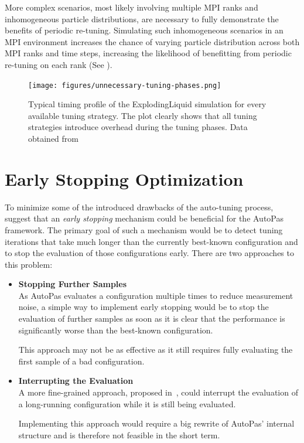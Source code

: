 \documentclass[conference]{IEEEtran}
\begin{document}
More complex scenarios, most likely involving multiple MPI ranks and inhomogeneous particle distributions, are necessary to fully demonstrate the benefits of periodic re-tuning. Simulating such inhomogeneous scenarios in an MPI environment increases the chance of varying particle distribution across both MPI ranks and time steps, increasing the likelihood of benefitting from periodic re-tuning on each rank (See \cite{Newcome2023Poster}).

\begin{figure}[h]
    \centering
    \texttt{[image: figures/unnecessary-tuning-phases.png]}
    \caption{
        Typical timing profile of the ExplodingLiquid simulation for every available tuning strategy. The plot clearly shows that all tuning strategies introduce overhead during the tuning phases. Data obtained from \cite{lerchner2024}
    }
    \label{fig:unnecessary-tuning-phases}
\end{figure}

\newpage

\section{Early Stopping Optimization}
\label{sec:early-stopping}

To minimize some of the introduced drawbacks of the auto-tuning process, \cite{endreport.pdf}\cite{Manuel_Lerchner_Thesis.pdf}\cite{autopas_issue673} suggest that an \textit{early stopping} mechanism could be beneficial for the AutoPas framework. The primary goal of such a mechanism would be to detect tuning iterations that take much longer than the currently best-known configuration and to stop the evaluation of those configurations early. There are two approaches to this problem:


\begin{itemize}
    \item \textbf{Stopping Further Samples}\\
          As AutoPas evaluates a configuration multiple times to reduce measurement noise, a simple way to implement early stopping would be to stop the evaluation of further samples as soon as it is clear that the performance is significantly worse than the best-known configuration.

          This approach may not be as effective as it still requires fully evaluating the first sample of a bad configuration.
    \item \textbf{Interrupting the Evaluation}\\
          A more fine-grained approach, proposed in~\cite{endreport.pdf}, could interrupt the evaluation of a long-running configuration while it is still being evaluated.

          Implementing this approach would require a big rewrite of AutoPas' internal structure and is therefore not feasible in the short term.
\end{itemize}
\end{document}
